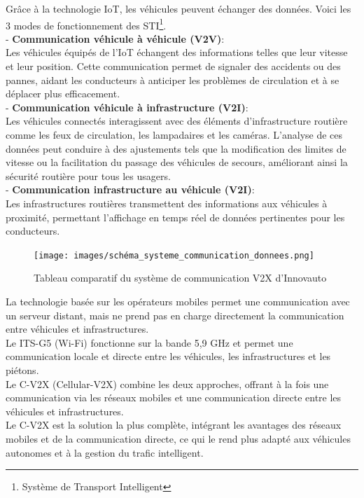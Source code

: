 \documentclass{article}
\begin{document}
Grâce à la technologie IoT, les véhicules peuvent échanger des données. Voici les 3 modes de fonctionnement des STI\footnote{Système de Transport Intelligent}.\\
- \textbf{Communication véhicule à véhicule (V2V)}:\\
Les véhicules équipés de l’IoT échangent des informations telles que leur vitesse et leur position. Cette communication permet de signaler des accidents ou des pannes, aidant les conducteurs à anticiper les problèmes de circulation et à se déplacer plus efficacement.\\
- \textbf{Communication véhicule à infrastructure (V2I)}:\\
Les véhicules connectés interagissent avec des éléments d’infrastructure routière comme les feux de circulation, les lampadaires et les caméras. 
L’analyse de ces données peut conduire à des ajustements tels que la modification des limites de vitesse ou la facilitation du passage des véhicules de secours, améliorant ainsi la sécurité routière pour tous les usagers.\\
- \textbf{Communication infrastructure au véhicule (V2I)}:\\
Les infrastructures routières transmettent des informations aux véhicules à proximité, permettant l’affichage en temps réel de données pertinentes pour les conducteurs.

\begin{figure}[h]
    \centering
    \texttt{[image: images/schéma\_systeme\_communication\_donnees.png]} 
    \caption{Tableau comparatif du système de communication V2X d'Innovauto}
\end{figure}

La technologie basée sur les opérateurs mobiles permet une communication avec un serveur distant, mais ne prend pas en charge directement la communication entre véhicules et infrastructures.\\
Le ITS-G5 (Wi-Fi) fonctionne sur la bande 5,9 GHz et permet une communication locale et directe entre les véhicules, les infrastructures et les piétons.\\
Le C-V2X (Cellular-V2X) combine les deux approches, offrant à la fois une communication via les réseaux mobiles et une communication directe entre les véhicules et infrastructures.\\
Le C-V2X est la solution la plus complète, intégrant les avantages des réseaux mobiles et de la communication directe, ce qui le rend plus adapté aux véhicules autonomes et à la gestion du trafic intelligent.
\end{document}
